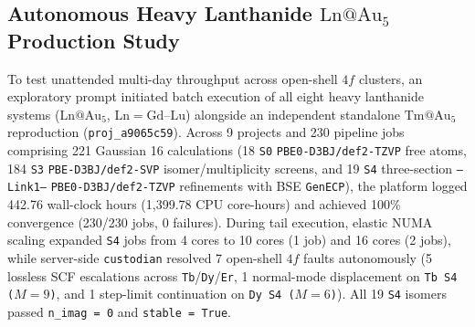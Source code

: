 \documentclass[journal=jctcce,manuscript=article]{achemso}
\begin{document}
\subsection{Autonomous Heavy Lanthanide $\mathrm{Ln@Au_5}$ Production Study}

To test unattended multi-day throughput across open-shell $4f$ clusters, an exploratory prompt initiated batch execution of all eight heavy lanthanide systems ($\mathrm{Ln@Au_5}$, $\mathrm{Ln} = \mathrm{Gd\text{--}Lu}$) alongside an independent standalone $\mathrm{Tm@Au_5}$ reproduction (\texttt{proj\_a9065c59}). Across 9 projects and 230 pipeline jobs comprising 221 Gaussian 16 calculations (18 \texttt{S0} \texttt{PBE0-D3BJ/def2-TZVP} free atoms, 184 \texttt{S3} \texttt{PBE-D3BJ/def2-SVP} isomer/multiplicity screens, and 19 \texttt{S4} three-section \texttt{--Link1--} \texttt{PBE0-D3BJ/def2-TZVP} refinements with BSE \texttt{GenECP}), the platform logged 442.76 wall-clock hours (1,399.78 CPU core-hours) and achieved 100\% convergence (230/230 jobs, 0 failures). During tail execution, elastic NUMA scaling expanded \texttt{S4} jobs from 4 cores to 10 cores (1 job) and 16 cores (2 jobs), while server-side \texttt{custodian} resolved 7 open-shell $4f$ faults autonomously (5 lossless SCF escalations across \texttt{Tb}/\texttt{Dy}/\texttt{Er}, 1 normal-mode displacement on \texttt{Tb S4 ($M=9$)}, and 1 step-limit continuation on \texttt{Dy S4 ($M=6$)}). All 19 \texttt{S4} isomers passed \texttt{n\_imag = 0} and \texttt{stable = True}.
\end{document}
